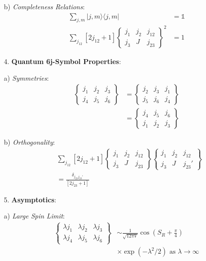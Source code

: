 \documentclass[12pt,a4paper]{article}
\begin{document}
   b) \textit{Completeness Relations}:
      \[
      \begin{aligned}
      \sum_{j,m} |j,m\rangle\langle j,m| &= \mathbb{1} \\
      \sum_{j_{12}} [2j_{12}+1] 
      \begin{Bmatrix}
      j_1 & j_2 & j_{12} \\
      j_3 & J & j_{23}
      \end{Bmatrix}^2 &= 1
      \end{aligned}
      \]

4. \textbf{Quantum 6j-Symbol Properties}:
   
   a) \textit{Symmetries}:
      \[
      \begin{aligned}
      \begin{Bmatrix}
      j_1 & j_2 & j_3 \\
      j_4 & j_5 & j_6
      \end{Bmatrix} &= 
      \begin{Bmatrix}
      j_2 & j_3 & j_1 \\
      j_5 & j_6 & j_4
      \end{Bmatrix} \\
      &= \begin{Bmatrix}
      j_4 & j_5 & j_6 \\
      j_1 & j_2 & j_3
      \end{Bmatrix}
      \end{aligned}
      \]
   
   b) \textit{Orthogonality}:
      \[
      \begin{aligned}
      &\sum_{j_{12}} [2j_{12}+1]
      \begin{Bmatrix}
      j_1 & j_2 & j_{12} \\
      j_3 & J & j_{23}
      \end{Bmatrix}
      \begin{Bmatrix}
      j_1 & j_2 & j_{12} \\
      j_3 & J & j_{23}'
      \end{Bmatrix} \\
      &= \frac{\delta_{j_{23}j_{23}'}}{[2j_{23}+1]}
      \end{aligned}
      \]

5. \textbf{Asymptotics}:
   
   a) \textit{Large Spin Limit}:
      \[
      \begin{aligned}
      \begin{Bmatrix}
      \lambda j_1 & \lambda j_2 & \lambda j_3 \\
      \lambda j_4 & \lambda j_5 & \lambda j_6
      \end{Bmatrix} &\sim \frac{1}{\sqrt{12\pi V}}\cos(S_R + \frac{\pi}{4}) \\
      &\times \exp(-\lambda^2/2) \text{ as } \lambda \to \infty
      \end{aligned}
      \]
   
\end{document}
